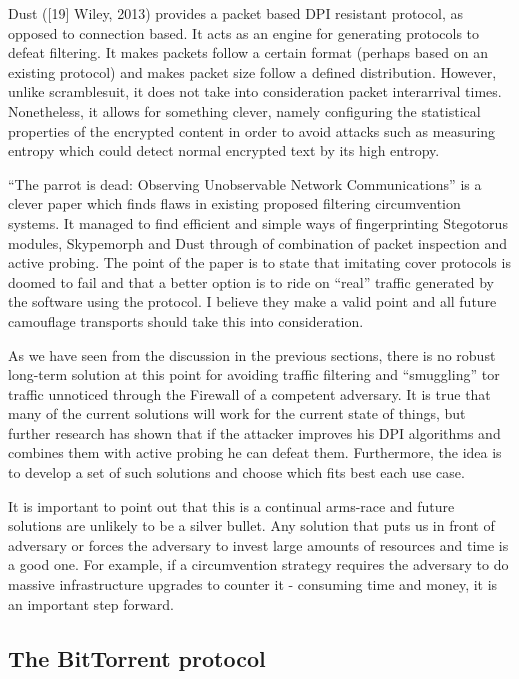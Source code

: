 \documentclass[11pt]{article} %
\begin{document}
Dust ([19] Wiley, 2013) provides a packet based DPI resistant protocol, as opposed to connection based. It acts as an engine for generating protocols to defeat filtering. It makes packets follow a certain format (perhaps based on an existing protocol) and makes packet size follow a defined distribution. However, unlike scramblesuit, it does not take into consideration packet interarrival times. Nonetheless, it allows for something clever, namely configuring the statistical properties of the encrypted content in order to avoid attacks such as measuring entropy which could detect normal encrypted text by its high entropy.

“The parrot is dead: Observing Unobservable Network Communications” is a clever paper which finds flaws in existing proposed filtering circumvention systems. It managed to find efficient and simple ways of fingerprinting Stegotorus modules, Skypemorph and Dust through of combination of packet inspection and active probing. The point of the paper is to state that imitating cover protocols is doomed to fail and that a better option is to ride on “real” traffic generated by the software using the protocol. I believe they make a valid point and all future camouflage transports should take this into consideration.


As we have seen from the discussion in the previous sections, there is no robust long-term solution at this point for avoiding traffic filtering and “smuggling” tor traffic unnoticed through the Firewall of a competent adversary. It is true that many of the current solutions will work for the current state of things, but further research has shown that if the attacker improves his DPI algorithms and combines them with active probing he can defeat them. Furthermore, the idea is to develop a set of such solutions and choose which fits best each use case.

It is important to point out  that this is a continual arms-race and future solutions are unlikely to be a silver bullet. Any solution that puts us in front of adversary or forces the adversary to invest large amounts of resources and time is a good one. For example, if a circumvention strategy requires the adversary to do massive infrastructure upgrades to counter it - consuming time and money, it is an important step forward.

\subsection{The BitTorrent protocol}
\end{document}
